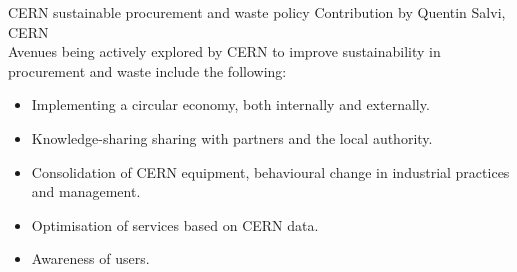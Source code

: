 \documentclass[../SustainableHEP.tex]{subfiles}
\begin{document}
\begin{bestpractice}{CERN sustainable procurement and waste policy}
{\footnotesize Contribution by Quentin Salvi, CERN}\\
Avenues being actively explored by CERN to improve sustainability in procurement and waste include the following:
\begin{itemize}
    \item Implementing a circular economy, both internally and externally.      
\item Knowledge-sharing sharing with partners and the local authority. 
\item Consolidation of CERN equipment, 
behavioural change in industrial practices and management. 
\item Optimisation of services based on CERN data. 
\item Awareness of users.
\end{itemize}
\end{bestpractice}



    

\end{document}
